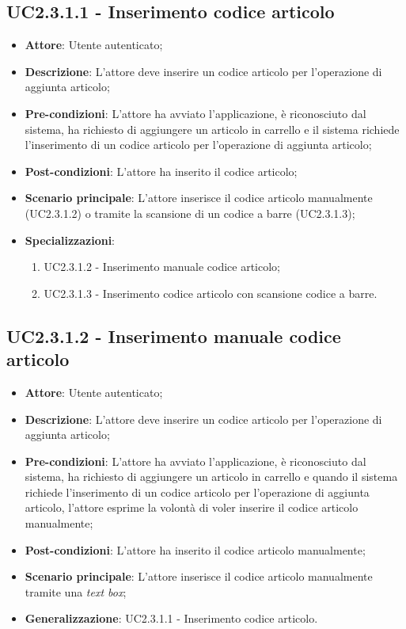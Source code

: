 \subsection{UC2.3.1.1 - Inserimento codice articolo}

\begin{itemize}
	\item \textbf{Attore}: Utente autenticato;
	\item \textbf{Descrizione}: L'attore deve inserire un codice articolo per l'operazione di aggiunta articolo;
	\item \textbf{Pre-condizioni}: L'attore ha avviato l'applicazione, è riconosciuto dal sistema, ha richiesto di aggiungere un articolo in carrello e il sistema richiede l'inserimento di un codice articolo per l'operazione di aggiunta articolo;
	\item \textbf{Post-condizioni}: L'attore ha inserito il codice articolo;
	\item \textbf{Scenario principale}: L'attore inserisce il codice articolo manualmente (UC2.3.1.2) o tramite la scansione di un codice a barre (UC2.3.1.3);
	\item \textbf{Specializzazioni}: 
		\begin{enumerate}
			\item UC2.3.1.2 - Inserimento manuale codice articolo;
			\item UC2.3.1.3 - Inserimento codice articolo con scansione codice a barre.
		\end{enumerate}		 
\end{itemize}

\subsection{UC2.3.1.2 - Inserimento manuale codice articolo}

\begin{itemize}
	\item \textbf{Attore}: Utente autenticato;
	\item \textbf{Descrizione}: L'attore deve inserire un codice articolo per l'operazione di aggiunta articolo;
	\item \textbf{Pre-condizioni}: L'attore ha avviato l'applicazione, è riconosciuto dal sistema, ha richiesto di aggiungere un articolo in carrello e quando il sistema richiede l'inserimento di un codice articolo per l'operazione di aggiunta articolo, l'attore esprime la volontà di voler inserire il codice articolo manualmente;
	\item \textbf{Post-condizioni}: L'attore ha inserito il codice articolo manualmente;
	\item \textbf{Scenario principale}: L'attore inserisce il codice articolo manualmente tramite una \textit{text box};
	\item \textbf{Generalizzazione}: UC2.3.1.1 - Inserimento codice articolo.
\end{itemize}

